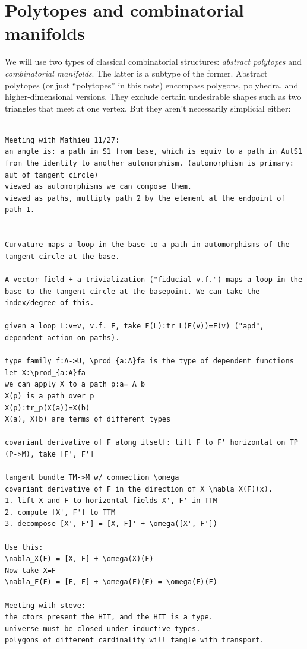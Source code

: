 \section{Polytopes and combinatorial manifolds}

We will use two types of classical combinatorial structures: \emph{abstract polytopes} and \emph{combinatorial manifolds}. The latter is a subtype of the former. Abstract polytopes (or just ``polytopes'' in this note) encompass polygons, polyhedra, and higher-dimensional versions. They exclude certain undesirable shapes such as two triangles that meet at one vertex. But they aren't necessarily simplicial either:


\begin{verbatim}

Meeting with Mathieu 11/27:
an angle is: a path in S1 from base, which is equiv to a path in AutS1 from the identity to another automorphism. (automorphism is primary: aut of tangent circle)
viewed as automorphisms we can compose them.
viewed as paths, multiply path 2 by the element at the endpoint of path 1.


Curvature maps a loop in the base to a path in automorphisms of the tangent circle at the base.

A vector field + a trivialization ("fiducial v.f.") maps a loop in the base to the tangent circle at the basepoint. We can take the index/degree of this.

given a loop L:v=v, v.f. F, take F(L):tr_L(F(v))=F(v) ("apd", dependent action on paths).

type family f:A->U, \prod_{a:A}fa is the type of dependent functions
let X:\prod_{a:A}fa
we can apply X to a path p:a=_A b
X(p) is a path over p
X(p):tr_p(X(a))=X(b)
X(a), X(b) are terms of different types

covariant derivative of F along itself: lift F to F' horizontal on TP (P->M), take [F', F']

tangent bundle TM->M w/ connection \omega
covariant derivative of F in the direction of X \nabla_X(F)(x). 
1. lift X and F to horizontal fields X', F' in TTM
2. compute [X', F'] to TTM
3. decompose [X', F'] = [X, F]' + \omega([X', F'])

Use this:
\nabla_X(F) = [X, F] + \omega(X)(F)
Now take X=F
\nabla_F(F) = [F, F] + \omega(F)(F) = \omega(F)(F)

Meeting with steve:
the ctors present the HIT, and the HIT is a type.
universe must be closed under inductive types.
polygons of different cardinality will tangle with transport.



\end{verbatim}

